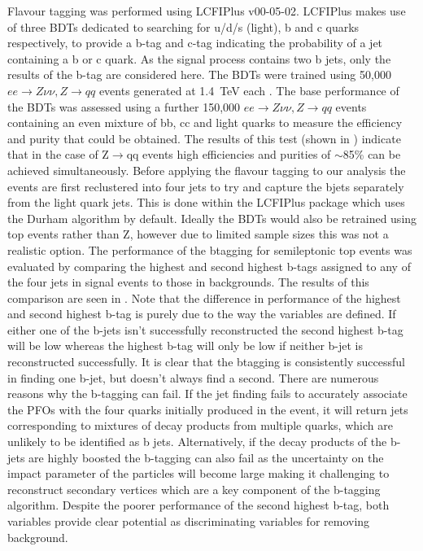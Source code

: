 Flavour tagging was performed using LCFIPlus v00-05-02\cite{Suehara:2015ura}. LCFIPlus makes use of three BDTs dedicated to searching for u/d/s (light), b and c quarks respectively, to provide a b-tag and c-tag indicating the probability of a jet containing a b or c quark. As the signal process contains two b jets, only the results of the b-tag are considered here. The BDTs were trained using 50,000 $ee\rightarrow Z\nu\nu, Z\rightarrow qq$ events generated at 1.4~TeV each . The base performance of the BDTs was assessed using a further 150,000 $ee\rightarrow Z\nu\nu, Z\rightarrow qq$ events containing an even mixture of bb, cc and light quarks to measure the efficiency and purity that could be obtained. The results of this test (shown in ) indicate that in the case of Z$\rightarrow$qq events high efficiencies and purities of $\sim$85\% can be achieved simultaneously. Before applying the flavour tagging to our analysis the events are first reclustered into four jets to try and capture the bjets separately from the light quark jets. This is done within the LCFIPlus package which uses the Durham algorithm by default. Ideally the BDTs would also be retrained using top events rather than Z, however due to limited sample sizes this was not a realistic option. The performance of the btagging for semileptonic top events was evaluated by comparing the highest and second highest b-tags assigned to any of the four jets in signal events to those in backgrounds. The results of this comparison are seen in . Note that the difference in performance of the highest and second highest b-tag is purely due to the way the variables are defined. If either one of the b-jets isn't successfully reconstructed the second highest b-tag will be low whereas the highest b-tag will only be low if neither b-jet is reconstructed successfully. It is clear that the btagging is consistently successful in finding one b-jet, but doesn't always find a second. There are numerous reasons why the b-tagging can fail. If the jet finding fails to accurately associate the PFOs with the four quarks initially produced in the event, it will return jets corresponding to mixtures of decay products from multiple quarks, which are unlikely to be identified as b jets. Alternatively, if the decay products of the b-jets are highly boosted the b-tagging can also fail as the uncertainty on the impact parameter of the particles will become large making it challenging to reconstruct secondary vertices which are a key component of the b-tagging algorithm. Despite the poorer performance of the second highest b-tag, both variables provide clear potential as discriminating variables for removing background.

